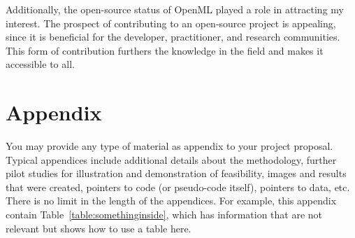 \documentclass{article}
\begin{document}
Additionally, the open-source status of OpenML played a role in attracting my interest. The prospect of contributing to an open-source project is appealing, since it is beneficial for the developer, practitioner, and research communities. This form of contribution furthers the knowledge in the field and makes it accessible to all.




\appendix
\section{Appendix}
 {
  \color{red}

  You may provide any type of material as appendix to your project proposal. Typical appendices include additional details about the methodology, further pilot studies for illustration and demonstration of feasibility, images and results that were created, pointers to code (or pseudo-code itself), pointers to data, etc. There is no limit in the length of the appendices. For example, this appendix contain Table~\ref{table:somethinginside}, which has information that are not relevant but shows how to use a table here.

}
\end{document}
